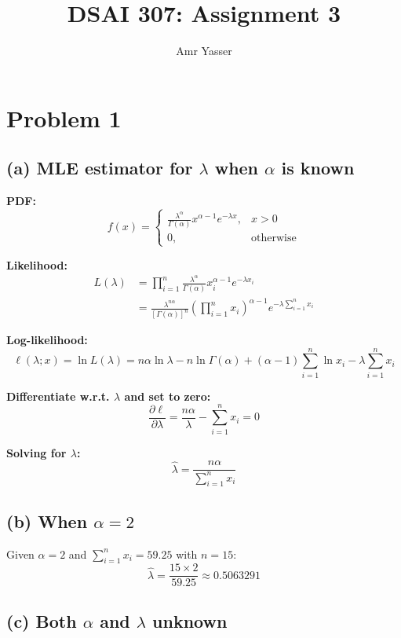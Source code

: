 \documentclass{article}
\begin{document}
\title{DSAI 307: Assignment 3}
\author{Amr Yasser}
\maketitle

\section{Problem 1}

\subsection{(a) MLE estimator for $\lambda$ when $\alpha$ is known}

\textbf{PDF:}
\[
f(x) = 
\begin{cases}
\frac{\lambda^\alpha}{\Gamma(\alpha)} x^{\alpha-1} e^{-\lambda x}, & x > 0 \\
0, & \text{otherwise}
\end{cases}
\]

\textbf{Likelihood:}
\begin{align*}
L(\lambda) &= \prod_{i=1}^{n} \frac{\lambda^\alpha}{\Gamma(\alpha)} x_i^{\alpha-1} e^{-\lambda x_i} \\
&= \frac{\lambda^{n\alpha}}{[\Gamma(\alpha)]^n} \left(\prod_{i=1}^{n} x_i\right)^{\alpha-1} e^{-\lambda \sum_{i=1}^{n} x_i}
\end{align*}

\textbf{Log-likelihood:}
\[
\ell(\lambda; x) = \ln L(\lambda) = n\alpha \ln \lambda - n \ln \Gamma(\alpha) + (\alpha-1) \sum_{i=1}^{n} \ln x_i - \lambda \sum_{i=1}^{n} x_i
\]

\textbf{Differentiate w.r.t. $\lambda$ and set to zero:}
\[
\frac{\partial \ell}{\partial \lambda} = \frac{n\alpha}{\lambda} - \sum_{i=1}^{n} x_i = 0
\]

\textbf{Solving for $\lambda$:}
\[
\boxed{\hat{\lambda} = \frac{n\alpha}{\sum_{i=1}^{n} x_i}}
\]

\subsection{(b) When $\alpha = 2$}

Given $\alpha = 2$ and $\sum_{i=1}^{n} x_i = 59.25$ with $n = 15$:
\[
\boxed{\hat{\lambda} = \frac{15 \times 2}{59.25} \approx 0.5063291}
\]

\subsection{(c) Both $\alpha$ and $\lambda$ unknown}
\end{document}
